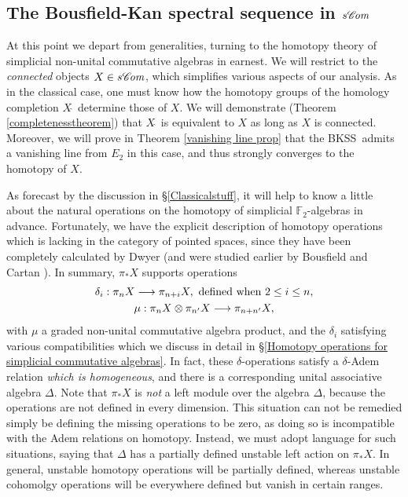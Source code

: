 \documentclass[11pt]{amsart} \renewcommand{\baselinestretch}{1.2}
\theoremstyle{plain}
\numberwithin{equation}{section} %
\theoremstyle{plain}
\numberwithin{equation}{chapter} %
\renewcommand{\to}{\longrightarrow}
\newcommand{\scrC}{\mathscr{C}}
\newcommand{\calX}{\mathcal{X}}
\newcommand{\calc}{\mathcal{C}}
\newcommand{\F}{\mathbb{F}}
\newcommand{\algs}{{\scrC\!\textit{\normalfont\textit{om}}}}
\newcommand{\Ftwo}{\F_2}
\newcommand{\E}[5]{[E^{#1}_{#2}#3]^{#4}_{#5}}
\newcommand{\BKSS}{BKSS}
\newcommand{\SubsectionOrSection}[1]{\subsection{#1}}
\begin{document}
\begin{Introduction}
\SubsectionOrSection{The Bousfield-Kan spectral sequence in $s\algs$}
At this point we depart from generalities, turning to the homotopy theory of simplicial non-unital commutative algebras in earnest.
We will restrict to the \emph{connected} objects $X\in s\algs$, which simplifies various aspects of our analysis.
As in the classical case, one must know how the homotopy groups of the homology completion $X\hat{\ }$ determine those of $X$. We will demonstrate (Theorem \ref{completenesstheorem}) that $X\hat{\ }$ is equivalent to $X$ as long as $X$ is connected. Moreover, we will prove in Theorem \ref{vanishing line prop} that the \BKSS\ admits a vanishing line from $E_2 $ in this case, and thus strongly converges to the homotopy of $X$.

As forecast by the discussion in \S\ref{Classicalstuff}, it will help to know a little about the natural operations on the homotopy of simplicial $\Ftwo$-algebras in advance. Fortunately, we have 
the explicit description of homotopy operations which is lacking in the category of pointed spaces, since they have been completely calculated by Dwyer \cite{DwyerHtpyOpsSimpComAlg.pdf} (and were studied earlier by Bousfield \cite{BousOpnsDerFun.pdf,BousHomogFunctors.pdf} and Cartan \cite{CartanDivSquares}). In summary, $\pi_*X$ supports operations
\begin{gather*}
\delta_i:\pi_nX\to \pi_{n+i}X,\textup{ defined when }2\leq i\leq n,\\
\mu:\pi_nX\otimes \pi_{n'}X\to \pi_{n+n'}X,
\end{gather*}
with $\mu$ a graded non-unital commutative algebra product, and %
the $\delta_i$ satisfying various compatibilities which we discuss in detail in \S\ref{Homotopy operations for simplicial commutative algebras}. In fact, these $\delta$-operations satisfy a $\delta$-Adem relation \emph{which is homogeneous}, and there is a corresponding unital associative algebra $\Delta$. Note that $\pi_*X$ is \emph{not} a left module over the algebra $\Delta$, because the operations are not defined in every dimension. This situation can not be remedied simply be defining the missing operations to be zero, as doing so is incompatible with the Adem relations on homotopy. Instead, we must adopt language for such situations, saying that $\Delta$ has a partially defined unstable left action on $\pi_*X$. In general, unstable homotopy operations will be  partially defined, whereas unstable cohomolgy operations will be everywhere defined but vanish in certain ranges.


\end{Introduction}
\end{document}

